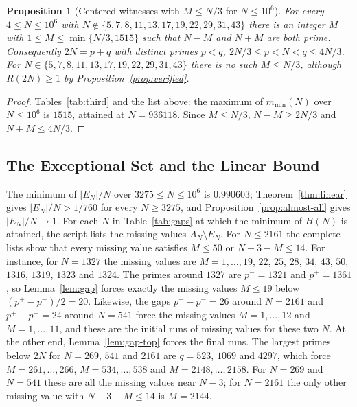 \documentclass[11pt]{amsart}
\newtheorem{Proposition}[Theorem]{Proposition}
\theoremstyle{definition}
\theoremstyle{remark}
\begin{document}
\begin{Proposition}[Centered witnesses with $M\leq N/3$ for $N\leq 10^6$]\label{prop:third-data}
For every $4\leq N\leq 10^6$ with $N\notin\{5,7,8,11,13,17,19,22,29,31,43\}$ there is an integer $M$ with $1\leq M\leq\min\{N/3,1515\}$ such that $N-M$ and $N+M$ are both prime. Consequently $2N=p+q$ with distinct primes $p<q$, $2N/3\leq p<N<q\leq 4N/3$. For $N\in\{5,7,8,11,13,17,19,22,29,31,43\}$ there is no such $M\leq N/3$, although $R(2N)\geq 1$ by Proposition~\ref{prop:verified}.
\end{Proposition}
\begin{proof}
Tables~\ref{tab:third} and the list above: the maximum of $m_{\min}(N)$ over $N\leq 10^6$ is $1515$, attained at $N=936118$. Since $M\leq N/3$, $N-M\geq 2N/3$ and $N+M\leq 4N/3$.
\end{proof}
\subsection{The Exceptional Set and the Linear Bound}\label{subsec:exceptional-data}
The minimum of $|E_N|/N$ over $3275\leq N\leq 10^6$ is $0.990603$; Theorem~\ref{thm:linear} gives $|E_N|/N>1/760$ for every $N\geq 3275$, and Proposition~\ref{prop:almost-all} gives $|E_N|/N\to 1$. For each $N$ in Table~\ref{tab:gaps} at which the minimum of $H(N)$ is attained, the script lists the missing values $A_N\setminus E_N$. For $N\leq 2161$ the complete lists show that every missing value satisfies $M\leq 50$ or $N-3-M\leq 14$. For instance, for $N=1327$ the missing values are $M=1,\ldots,19$, $22$, $25$, $28$, $34$, $43$, $50$, $1316$, $1319$, $1323$ and $1324$. The primes around $1327$ are $p^-=1321$ and $p^+=1361$, so Lemma~\ref{lem:gap} forces exactly the missing values $M\leq 19$ below $(p^+-p^-)/2=20$. Likewise, the gaps $p^+-p^-=26$ around $N=2161$ and $p^+-p^-=24$ around $N=541$ force the missing values $M=1,\ldots,12$ and $M=1,\ldots,11$, and these are the initial runs of missing values for these two $N$. At the other end, Lemma~\ref{lem:gap-top} forces the final runs. The largest primes below $2N$ for $N=269$, $541$ and $2161$ are $q=523$, $1069$ and $4297$, which force $M=261,\ldots,266$, $M=534,\ldots,538$ and $M=2148,\ldots,2158$. For $N=269$ and $N=541$ these are all the missing values near $N-3$; for $N=2161$ the only other missing value with $N-3-M\leq 14$ is $M=2144$.
\end{document}
